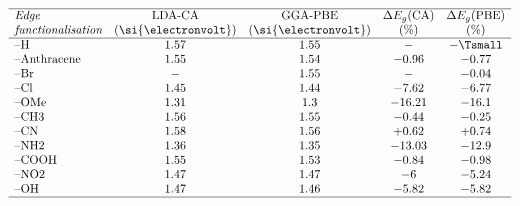 \begin{table}
    \caption{\label{tab:bandgaps}
        Calculated bandgaps using different exchange--correlation implementations.}
    \[
        \begin{array}{lcccc}
            \hline\textit{Edge}        & \textrm{LDA-CA}      & \textrm{GGA-PBE}     & \Delta E_g \textrm{(CA)} & \Delta E_g \textrm{(PBE)}             \\
            \textit{functionalisation} & (\si{\electronvolt}) & (\si{\electronvolt}) & (\%)                     & (\%)                                  \\
            \hline
            \text{--H}                 & 1.57                 & 1.55                 & -                        & -                             \Tsmall \\
            \text{--Anthracene}        & 1.55                 & 1.54                 & -0.96                    & -0.77                                 \\
            \text{--Br}                & -                    & 1.55                 & -                        & -0.04                                 \\
            \text{--Cl}                & 1.45                 & 1.44                 & -7.62                    & -6.77                                 \\
            \text{--OMe}               & 1.31                 & 1.3                  & -16.21                   & -16.1                                 \\
            \text{--CH3}               & 1.56                 & 1.55                 & -0.44                    & -0.25                                 \\
            \text{--CN}                & 1.58                 & 1.56                 & +0.62                    & +0.74                                 \\
            \text{--NH2}               & 1.36                 & 1.35                 & -13.03                   & -12.9                                 \\
            \text{--COOH}              & 1.55                 & 1.53                 & -0.84                    & -0.98                                 \\
            \text{--NO2}               & 1.47                 & 1.47                 & -6                       & -5.24                                 \\
            \text{--OH}                & 1.47                 & 1.46                 & -5.82                    & -5.82                                 \\
            \hline
        \end{array}
    \]
\end{table}


